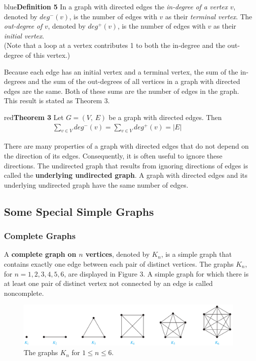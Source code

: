 \documentclass[11pt]{article}
\newenvironment{definition}[1]{\begin{mybox}{blue}{\textbf{Definition #1}}}{\end{mybox}}
\newenvironment{theorem}[1]{\begin{mybox}{red}{\textbf{Theorem #1}}}{\end{mybox}}
\begin{document}
\begin{definition}{5}
In a graph with directed edges the \textit{in-degree of a vertex $v$}, denoted by $deg^-(v)$, is the number of edges with $v$ as their \textit{terminal vertex}. The \textit{out-degree of $v$}, denoted by $deg^+(v)$, is the number of edges with $v$ as their \textit{initial vertex}.\\
(Note that a loop at a vertex contributes 1 to both the in-degree and the out-degree of this vertex.)
\end{definition}

Because each edge has an initial vertex and a terminal vertex, the sum of the in-degrees and the sum of the out-degrees of all vertices in a graph with directed edges are the same. Both of these sums are the number of edges in the graph. This result is stated as Theorem 3.

\begin{theorem}{3}
Let $G = (V,\ E)$ be a graph with directed edges. Then
\begin{align*}
    &\sum_{v \in V} deg^-(v) = \sum_{v \in V} deg^+(v) = |E| & & & & &
\end{align*}
\end{theorem}

There are many properties of a graph with directed edges that do not depend on the direction of its edges. Consequently, it is often useful to ignore these directions. The undirected graph that results from ignoring directions of edges is called the \textbf{underlying undirected graph}. A graph with directed edges and its underlying undirected graph have the same number of edges.

\subsection{Some Special Simple Graphs}

\subsubsection{Complete Graphs}
\setcounter{figure}{2}
A \textbf{complete graph on $n$ vertices}, denoted by $K_n$, is a simple graph that contains exactly one edge between each pair of distinct vertices. The graphs $K_n$, for $n = 1, 2, 3, 4, 5, 6$, are displayed in Figure 3. A simple graph for which there is at least one pair
of distinct vertex not connected by an edge is called noncomplete.

\begin{figure}[h!]
    \centering
    \includegraphics[width=\textwidth]{img/ch10.2-figure3.png}
    \caption{The graphs $K_n$ for $1 \leq n \leq 6$.}
    \label{fig:my_label}
\end{figure}
\end{document}
